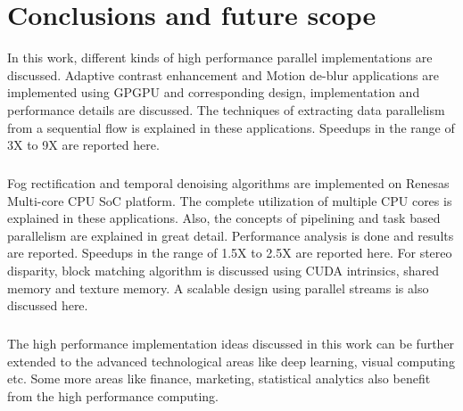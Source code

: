 \chapter{Conclusions and future scope}
In this work, different kinds of high performance parallel implementations are discussed. Adaptive contrast enhancement and Motion de-blur applications are implemented using GPGPU and corresponding design, implementation and performance details are discussed. The techniques of extracting data parallelism from a sequential flow is explained in these applications. Speedups in the range of 3X to 9X are reported here.\paragraph*{}Fog rectification and temporal denoising algorithms are implemented on Renesas Multi-core CPU SoC platform. The complete utilization of multiple CPU cores is explained in these applications. Also, the concepts of pipelining and task based parallelism are explained in great detail. Performance analysis is done and results are reported. Speedups in the range of 1.5X to 2.5X are reported here. For stereo disparity, block matching algorithm is discussed using CUDA intrinsics, shared memory and texture memory. A scalable design using parallel streams is also discussed here. \paragraph*{}The high performance implementation ideas discussed in this work can be further extended to the advanced technological areas like deep learning, visual computing etc. Some more areas like finance, marketing, statistical analytics also benefit from the high performance computing.